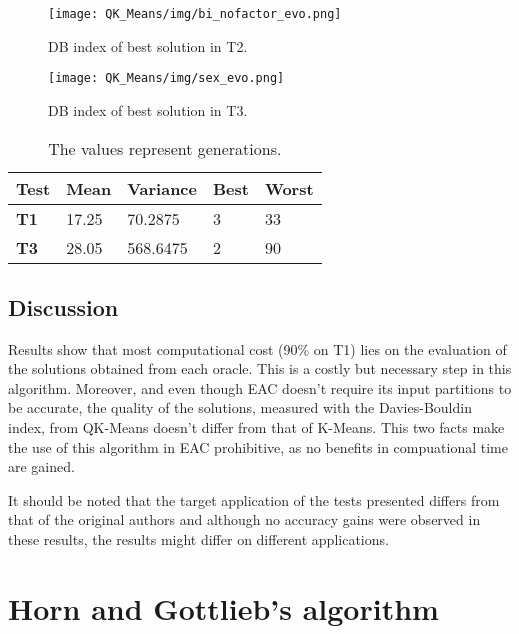 \begin{figure}[hbtp]
\centering
\texttt{[image: QK\_Means/img/bi\_nofactor\_evo.png]}
\caption{DB index of best solution in T2.}
\label{fig:qk_db_index_best_evo_t2}
\end{figure}


\begin{figure}[hbtp]
\centering
\texttt{[image: QK\_Means/img/sex\_evo.png]}
\caption{DB index of best solution in T3.}
\label{fig:qk_db_index_best_evo_t3}
\end{figure}


\begin{table}[h]
\caption{The values represent generations.}
\begin{tabular}{|l|l|l|l|l|}
\hline
\textbf{Test} & \textbf{Mean} & \textbf{Variance} & \textbf{Best} & \textbf{Worst} \\ \hline
\textbf{T1}   & 17.25         & 70.2875           & 3             & 33             \\ \hline
\textbf{T3}   & 28.05         & 568.6475          & 2             & 90             \\ \hline
\end{tabular}
\label{tab:db_index_t1_t3}
\end{table}

\subsection{Discussion}

Results show that most computational cost (90\% on T1) lies on the evaluation of the solutions obtained from each oracle. This is a costly but necessary step in this algorithm. Moreover, and even though EAC doesn't require its input partitions to be accurate, the quality of the solutions, measured with the Davies-Bouldin index, from QK-Means doesn't differ from that of K-Means. This two facts make the use of this algorithm in EAC prohibitive, as no benefits in compuational time are gained.

It should be noted that the target application of the tests presented differs from that of the original authors and although no accuracy gains were observed in these results, the results might differ on different applications.

\section{Horn and Gottlieb's algorithm}


